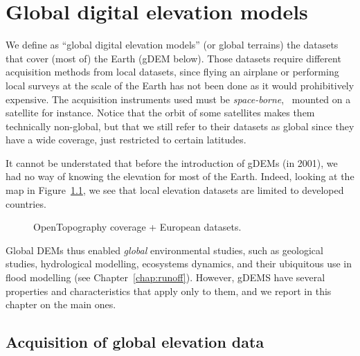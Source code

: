 
\setchapterpreamble[u]{\margintoc}
\graphicspath{{gdem/figs/}}


\chapter{Global digital elevation models}%
\label{chap:gdem}

We define as ``global digital elevation models'' (or global terrains) the datasets that cover (most of) the Earth (gDEM below).%
Those datasets require different acquisition methods from local datasets, since flying an airplane or performing local surveys at the scale of the Earth has not been done as it would prohibitively expensive.
The acquisition instruments used must be \emph{space-borne}, \ie\ mounted on a satellite for instance.
Notice that the orbit of some satellites makes them technically non-global, but that we still refer to their datasets as global since they have a wide coverage, just restricted to certain latitudes.

It cannot be understated that before the introduction of gDEMs (in 2001), we had no way of knowing the elevation for most of the Earth.
Indeed, looking at the map in Figure~\ref{fig:dem_coverage}, we see that local elevation datasets are limited to developed countries.

\begin{figure}
  \centering
  \caption{OpenTopography coverage + European datasets.}%
  \label{fig:dem_coverage}
\end{figure}

Global DEMs thus enabled \emph{global} environmental studies, such as geological studies, hydrological modelling, ecosystems dynamics, and their ubiquitous use in flood modelling (see Chapter~\ref{chap:runoff}).
However, gDEMS have several properties and characteristics that apply only to them, and we report in this chapter on the main ones.



%
\section[Acquisition of global data]{Acquisition of global elevation data}

